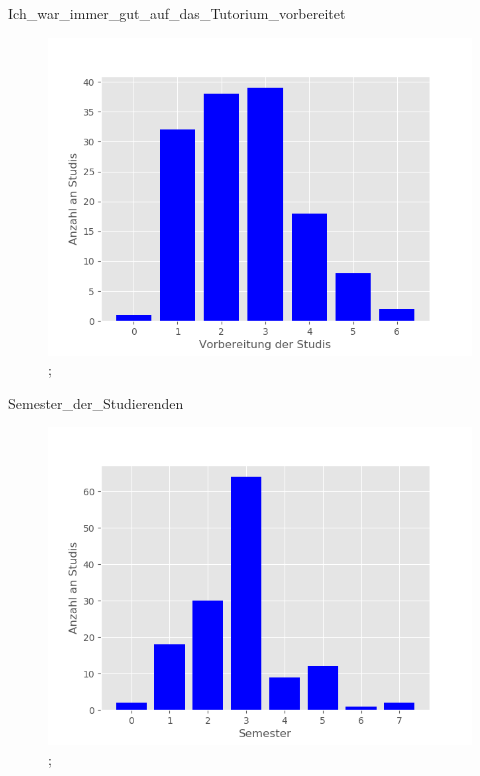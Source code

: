 \documentclass[10pt]{beamer}
\begin{document}
\begin{frame}[fragile]{Ich_war_immer_gut_auf_das_Tutorium_vorbereitet} 
 \begin{figure}
 \includegraphics[width= 0.9\linewidth]{./PDFcreater/Plots/Ich_war_immer_gut_auf_das_Tutorium_vorbereitet.png};
 \end{figure}
 \end{frame}
\begin{frame}[fragile]{Semester_der_Studierenden} 
 \begin{figure}
 \includegraphics[width= 0.9\linewidth]{./PDFcreater/Plots/Semester_der_Studierenden.png};
 \end{figure}
 \end{frame}
\end{document}
